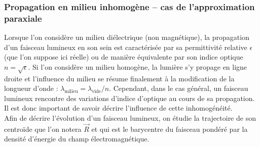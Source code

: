 \documentclass[a4paper,11pt]{article} %
\begin{document}
	\subsubsection{Propagation en milieu inhomogène -- cas de l'approximation paraxiale}
	Lorsque l'on considère un milieu diélectrique (non magnétique), la propagation d'un faisceau lumineux en son sein est caractérisée par sa permittivité relative $ \epsilon $ (que l'on suppose ici réelle) ou de manière équivalente par son indice optique $ n = \sqrt{\epsilon} $. Si l'on considère un milieu homogène, la lumière s'y propage en ligne droite et l'influence du milieu se résume finalement à la modification de la longueur d'onde : $ \lambda_\text{milieu} = \lambda_\text{vide} / n $. Cependant, dans le cas général, un faisceau lumineux rencontre des variations d'indice d'optique au cours de sa propagation. Il est donc important de savoir décrire l'influence de cette inhomogénéité.\\
	Afin de décrire l'évolution d'un faisceau lumineux, on étudie la trajectoire de son centroïde que l'on notera $ \vec{R} $ et qui est le barycentre du faisceau pondéré par la densité d'énergie du champ électromagnétique.\\
	
\end{document}
